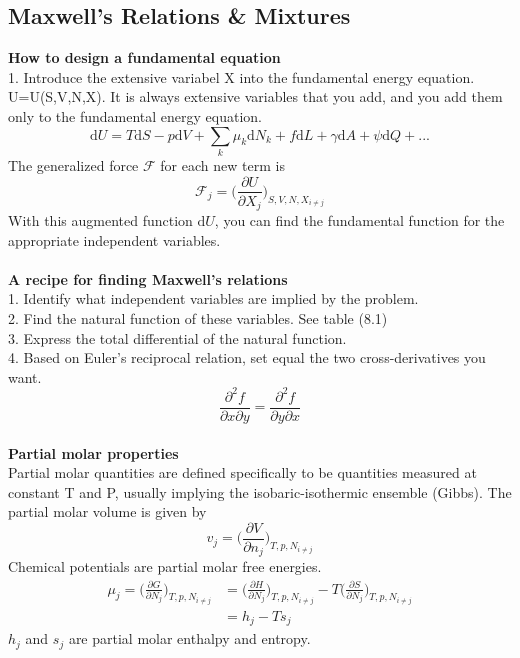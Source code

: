 \documentclass[8pt]{article}
\numberwithin{equation}{section}
\begin{document}
\begin{multicols}{2}
\section{Maxwell's Relations \& Mixtures}
\textbf{How to design a fundamental equation} \\
1. Introduce the extensive variabel X into the fundamental energy equation. U=U(S,V,N,X). It is always extensive variables that you add, and you add them only to the fundamental energy equation. 
\begin{equation}
\mathrm{d}U=T\mathrm{d}S-p\mathrm{d}V+\sum_{k} \mu_{k}\mathrm{d}N_{k}+f\mathrm{d}L+\gamma\mathrm{d}A+\psi\mathrm{d}Q+... \tag{9.1}
\end{equation}
The generalized force $\mathscr{F}$ for each new term is 
\begin{equation}
\mathscr{F}_{j}=\bigg( \frac{\partial U}{\partial X_{j}} \bigg)_{S,V,N,X_{i\neq j}} \tag{9.2}
\end{equation} 
With this augmented function $\mathrm{d}U$, you can find the fundamental function for the appropriate independent variables. \\\\
\textbf{A recipe for finding Maxwell's relations} \\
1. Identify what independent variables are implied by the problem. \\
2. Find the natural function of these variables. See table (8.1) \\
3. Express the total differential of the natural function. \\
4. Based on Euler's reciprocal relation, set equal the two cross-derivatives you want. \\
\begin{equation}
\frac{\partial^{2} f}{\partial x\partial y}=\frac{\partial^{2} f}{\partial y\partial x} \tag{4.39}
\end{equation} \\
\textbf{Partial molar properties} \\
Partial molar quantities are defined specifically to be quantities measured at constant T and P, usually implying the isobaric-isothermic ensemble (Gibbs). The partial molar volume is given by 
\begin{equation}
v_{j}=\bigg( \frac{\partial V}{\partial n_{j}} \bigg)_{T,p,N_{i\neq j}} \tag{9.29}
\end{equation}
Chemical potentials are partial molar free energies.
\begin{equation}\tag{9.32}
\begin{split}
\mu_{j} =\bigg( \frac{\partial G}{\partial N_{j}} \bigg)_{T,p,N_{i\neq j}}&=\bigg( \frac{\partial H}{\partial N_{j}} \bigg)_{T,p,N_{i\neq j}} - T\bigg( \frac{\partial S}{\partial N_{j}} \bigg)_{T,p,N_{i\neq j}} \\ &= h_{j}-Ts_{j}
\end{split}
\end{equation}
$h_{j}$ and $s_{j}$ are partial molar enthalpy and entropy. 

\end{multicols}
\end{document}
